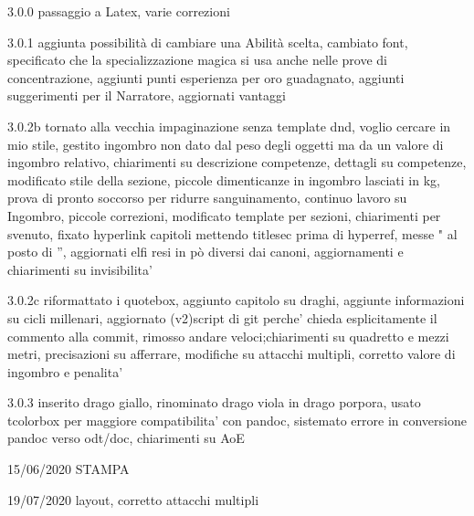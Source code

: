 \documentclass[a4paper,11pt,twoside,openany]{book}
\begin{document}
{{	3.0.0 passaggio a Latex, varie correzioni

	3.0.1 aggiunta possibilità di cambiare una Abilità scelta, cambiato font, specificato che la specializzazione magica si usa anche nelle prove di concentrazione, aggiunti punti esperienza per oro guadagnato, aggiunti suggerimenti per il Narratore, aggiornati vantaggi

	3.0.2b tornato alla vecchia impaginazione senza template dnd, voglio cercare in mio stile, gestito ingombro non dato dal peso degli oggetti ma da un valore di ingombro relativo, chiarimenti su descrizione competenze, dettagli su competenze, modificato stile della sezione, piccole dimenticanze in ingombro lasciati in kg, prova di pronto soccorso per ridurre sanguinamento, continuo lavoro su Ingombro, piccole correzioni, modificato template per sezioni, chiarimenti per svenuto, fixato hyperlink capitoli mettendo titlesec prima di hyperref, messe " al posto di '', aggiornati elfi resi in pò diversi dai canoni, aggiornamenti e chiarimenti su invisibilita'

	3.0.2c riformattato i quotebox, aggiunto capitolo su draghi, aggiunte informazioni su cicli millenari, aggiornato (v2)script di git perche' chieda esplicitamente il commento alla commit, rimosso andare veloci;chiarimenti su quadretto e mezzi metri, precisazioni su afferrare, modifiche su attacchi multipli, corretto valore di ingombro e penalita'

	3.0.3 inserito drago giallo, rinominato drago viola in drago porpora, usato tcolorbox per maggiore compatibilita' con pandoc, sistemato errore in conversione pandoc verso odt/doc, chiarimenti su AoE

	15/06/2020 STAMPA

	19/07/2020 layout, corretto attacchi multipli

}}
\end{document}
